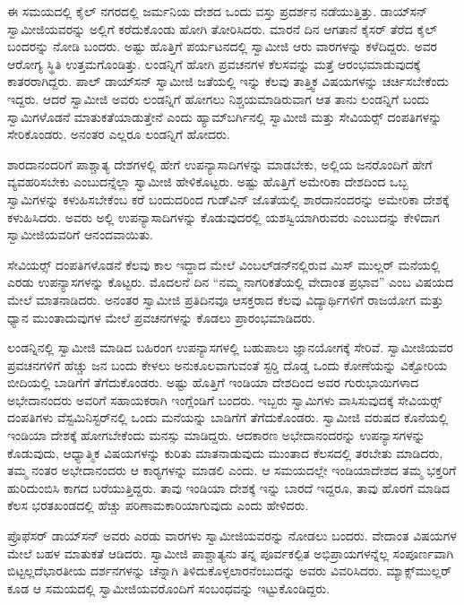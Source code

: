  ಈ ಸಮಯದಲ್ಲಿ ಕೈಲ್ ನಗರದಲ್ಲಿ ಜರ್ಮನಿಯ ದೇಶದ ಒಂದು ವಸ್ತು ಪ್ರದರ್ಶನ ನಡೆಯುತ್ತಿತ್ತು. ಡಾಯ್‍ಸನ್‍ ಸ್ವಾಮೀಜಿಯವರನ್ನು ಅಲ್ಲಿಗೆ ಕರೆದುಕೊಂಡು ಹೋಗಿ ತೋರಿಸಿದರು. ಮಾರನೆ ದಿನ ಆಗತಾನೆ ಕೈಸರ್ ತೆರೆದ ಕೈಲ್ ಬಂದರನ್ನು ನೋಡಿ ಬಂದರು. ಅಷ್ಟು ಹೊತ್ತಿಗೆ ಪರ್ಯಟನದಲ್ಲಿ ಸ್ವಾಮೀಜಿ ಆರು ವಾರಗಳನ್ನು ಕಳೆದಿದ್ದರು. ಅವರ ಆರೋಗ್ಯ ಸ್ಥಿತಿ ಉತ್ತಮಗೊಂಡಿತ್ತು. ಲಂಡನ್ನಿಗೆ ಹೋಗಿ ಪ್ರವಚನಗಳ ಕೆಲಸವನ್ನು ಮತ್ತೆ ಆರಂಭಮಾಡುವುದಕ್ಕೆ ಕಾತರರಾಗಿದ್ದರು. ಪಾಲ್ ಡಾಯ್‍ಸನ್‍ ಸ್ವಾಮೀಜಿ ಜತೆಯಲ್ಲಿ ಇನ್ನು ಕೆಲವು ತಾತ್ತ್ವಿಕ ವಿಷಯಗಳನ್ನು ಚರ್ಚಿಸಬೇಕೆಂದು ಇದ್ದರು. ಆದರೆ ಸ್ವಾಮೀಜಿ ಅವರು ಲಂಡನ್ನಿಗೆ ಹೋಗಲು ನಿಶ್ಚಯಮಾಡಿರುವಾಗ ಆತ ತಾನು ಲಂಡನ್ನಿಗೆ ಬಂದು ಸ್ವಾಮಿಗಳೊಡನೆ ಮಾತುಕತೆಯಾಡುತ್ತೇನೆ ಎಂದು ಹ್ಯಾಮ್‍ಬರ್ಗಿನಲ್ಲಿ ಸ್ವಾಮೀಜಿ ಮತ್ತು ಸೇವಿಯರ್ಸ್‍‍ ದಂಪತಿಗಳನ್ನು ಸೇರಿಕೊಂಡರು. ಅನಂತರ ಎಲ್ಲರೂ ಲಂಡನ್ನಿಗೆ ಹೋದರು. 

 ಶಾರದಾನಂದರಿಗೆ ಪಾಶ್ಚಾತ್ಯ ದೇಶಗಳಲ್ಲಿ ಹೇಗೆ ಉಪನ್ಯಾಸಾದಿಗಳನ್ನು ಮಾಡಬೇಕು, ಅಲ್ಲಿಯ ಜನರೊಂದಿಗೆ ಹೇಗೆ ವ್ಯವಹರಿಸಬೇಕು ಎಂಬುದನ್ನೆಲ್ಲಾ ಸ್ವಾಮೀಜಿ ಹೇಳಿಕೊಟ್ಟರು. ಅಷ್ಟು ಹೊತ್ತಿಗೆ ಅಮೇರಿಕಾ ದೇಶದಿಂದ ಒಬ್ಬ ಸ್ವಾಮಿಗಳನ್ನು ಕಳುಹಿಸಬೇಕೆಂಬ ಕರೆ ಬಂದುದರಿಂದ ಗುಡ್‍ವಿನ್ ಜೊತೆಯಲ್ಲಿ ಶಾರದಾನಂದರನ್ನು ಅಮೇರಿಕಾ ದೇಶಕ್ಕೆ ಕಳುಹಿಸಿದರು. ಅವರು ಅಲ್ಲಿ ಉಪನ್ಯಾಸಾದಿಗಳನ್ನು ಕೊಡುವುದರಲ್ಲಿ ಯಶಸ್ವಿಯಾಗಿರುವರು ಎಂಬುದನ್ನು ಕೇಳಿದಾಗ ಸ್ವಾಮೀಜಿಯವರಿಗೆ ಆನಂದವಾಯಿತು. 

 ಸೇವಿಯರ್ಸ್‍‍ ದಂಪತಿಗಳೊಡನೆ ಕೆಲವು ಕಾಲ ಇದ್ದಾದ ಮೇಲೆ ವಿಂಬಲ್‍ಡನ್‍ನಲ್ಲಿರುವ ಮಿಸ್ ಮುಲ್ಲರ್ ಮನೆಯಲ್ಲಿ ಎರಡು ಉಪನ್ಯಾಸಗಳನ್ನು ಕೊಟ್ಟರು. ಮೊದಲನೆ ದಿನ “ನಮ್ಮ ನಾಗರಿಕತೆಯಲ್ಲಿ ವೇದಾಂತ ಪ್ರಭಾವ” ಎಂಬ ವಿಷಯದ ಮೇಲೆ ಮಾತನಾಡಿದರು. ಅನಂತರ ಸ್ವಾಮೀಜಿ ಪ್ರತಿದಿನವೂ ಆಸಕ್ತರಾದ ಕೆಲವು ವಿದ್ಯಾರ್ಥಿಗಳಿಗೆ ರಾಜಯೋಗ ಮತ್ತು ಧ್ಯಾನ ಮುಂತಾದುವುಗಳ ಮೇಲೆ ಪ್ರವಚನಗಳನ್ನು ಕೊಡಲು ಪ್ರಾರಂಭಮಾಡಿದರು. 

 ಲಂಡನ್ನಿನಲ್ಲಿ ಸ್ವಾಮೀಜಿ ಮಾಡಿದ ಬಹಿರಂಗ ಉಪನ್ಯಾಸಗಳಲ್ಲಿ ಬಹುಪಾಲು ಜ್ಞಾನಯೋಗಕ್ಕೆ ಸೇರಿವೆ. ಸ್ವಾಮೀಜಿಯವರ ಪ್ರವಚನಗಳಿಗೆ ಹೆಚ್ಚು ಜನ ಬಂದು ಕೇಳಲು ಅನುಕೂಲವಾಗುವಂತೆ ಸ್ಟರ‍್ಡಿ ದೊಡ್ಡ ಒಂದು ಕೋಣೆಯನ್ನು ವಿಕ್ಟೋರಿಯ ಬೀದಿಯಲ್ಲಿ ಬಾಡಿಗೆಗೆ ತೆಗೆದುಕೊಂಡರು. ಅಷ್ಟು ಹೊತ್ತಿಗೆ ಇಂಡಿಯಾ ದೇಶದಿಂದ ಅವರ ಗುರುಭಾಯಿಗಳಾದ ಅಭೇದಾನಂದರು ಅವರಿಗೆ ಸಹಾಯಕರಾಗಿ ಇಂಗ್ಲೆಂಡಿಗೆ ಬಂದರು. ಇಬ್ಬರು ಸ್ವಾಮಿಗಳು ವಾಸಿಸುವುದಕ್ಕೆ ಸೇವಿಯರ್ಸ್‍‍ ದಂಪತಿಗಳು ವೆಸ್ಟಮಿನಿಸ್ಟರ್‌ನಲ್ಲಿ ಒಂದು ಮನೆಯನ್ನು ಬಾಡಿಗೆಗೆ ತೆಗೆದುಕೊಂಡರು. ಸ್ವಾಮೀಜಿ ವರುಷದ ಕೊನೆಯಲ್ಲಿ ಇಂಡಿಯಾ ದೇಶಕ್ಕೆ ಹೋಗಬೇಕೆಂದು ಮನಸ್ಸು ಮಾಡಿದ್ದರು. ಆದಕಾರಣ ಅಭೇದಾನಂದರನ್ನು ಉಪನ್ಯಾಸಗಳನ್ನು ಕೊಡುವುದು, ಆಧ್ಯಾತ್ಮಿಕ ವಿಷಯಗಳನ್ನು ಕುರಿತು ಮಾತನಾಡುವುದು ಮುಂತಾದ ಕೆಲಸದಲ್ಲಿ ತರಬೇತು ಮಾಡಿದರು, ತಮ್ಮ ನಂತರ ಅಭೇದಾನಂದರು ಆ ಕಾರ‍್ಯಗಳನ್ನು ಮಾಡಲಿ ಎಂದು. ಆ ಸಮಯದಲ್ಲೇ ಇಂಡಿಯಾದೇಶದ ತಮ್ಮ ಭಕ್ತರಿಗೆ ಹುರಿದುಂಬಿಸಿ ಕಾಗದ ಬರೆಯುತ್ತಿದ್ದರು. ತಾವು ಇಂಡಿಯಾ ದೇಶಕ್ಕೆ ಇನ್ನು ಬಾರದೆ ಇದ್ದರೂ, ತಾವು ಹೊರಗೆ ಮಾಡಿದ ಕೆಲಸ ಭರತಖಂಡದಲ್ಲಿ ಹೆಚ್ಚು ಪರಿಣಾಮಕಾರಿಯಾಗುವುದು ಎಂದು ಹೇಳಿದರು. 

 ಪ್ರೊಫೆಸರ್ ಡಾಯ್‍ಸನ್‍ ಅವರು ಎರಡು ವಾರಗಳು ಸ್ವಾಮೀಜಿಯವರನ್ನು ನೋಡಲು ಬಂದರು. ವೇದಾಂತ ವಿಷಯಗಳ ಮೇಲೆ ಬಹಳ ಮಾತುಕತೆ ಆಡಿದರು. ಸ್ವಾಮೀಜಿ ಪಾಶ್ಚಾತ್ಯನು ತನ್ನ ಪೂರ್ವಕಲ್ಪಿತ ಅಭಿಪ್ರಾಯಗಳನ್ನೆಲ್ಲ ಸಂಪೂರ್ಣವಾಗಿ ಬಿಟ್ಟಲ್ಲದೆ\break ಭಾರತೀಯ ದರ್ಶನಗಳನ್ನು ಚೆನ್ನಾಗಿ ತಿಳಿದುಕೊಳ್ಳಲಾರನೆಂಬುದನ್ನು ಅವರು ವಿವರಿಸಿದರು. ಮ್ಯಾಕ್ಸ್‌ಮುಲ್ಲರ್ ಕೂಡ ಆ ಸಮಯದಲ್ಲಿ ಸ್ವಾಮೀಜಿಯವರೊಂದಿಗೆ ಸಂಬಂಧವನ್ನು ಇಟ್ಟುಕೊಂಡಿದ್ದರು. 

